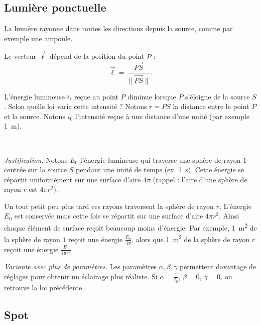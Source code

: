 \documentclass[11pt,class=report,crop=false]{standalone}
\begin{document}
\subsection{Lumière ponctuelle}
\label{ssec:lumiere-ponctuelle}

La lumière \og{}rayonne\fg{} dans toutes les directions depuis la source, comme par exemple une ampoule.



Le vecteur $\vec\ell$ dépend de la position du point $P$ :
$$\vec \ell = \frac{\overrightarrow{PS}}{\|\overrightarrow{PS}\|}.$$

L'énergie lumineuse $i_\ell$ reçue au point $P$ diminue lorsque $P$ s'éloigne de la source $S$. Selon quelle loi varie cette intensité ?
Notons $r = PS$ la distance entre le point $P$ et la source. Notons $i_0$ l'intensité reçue à une distance d'une unité (par exemple \SI{1}{\meter}).
\begin{proposition}
~
\end{proposition}

\emph{Justification.} Notons $E_0$ l'énergie lumineuse qui traverse une sphère de rayon $1$ centrée sur la source $S$ pendant une unité de temps (ex. \SI{1}{\second}). Cette énergie se répartit uniformément sur une surface d'aire $4\pi$ (rappel : l'aire d'une sphère de rayon $r$ est $4\pi r^2$). 



Un tout petit peu plus tard ces rayons traversent la sphère de rayon $r$. L'énergie $E_0$ est conservée mais cette fois se répartit sur une surface d'aire $4\pi r^2$. Ainsi chaque élément de surface reçoit beaucoup moins d'énergie.
Par exemple, \SI{1}{\meter^2} de la sphère de rayon $1$ reçoit une énergie $\frac{E_0}{4\pi}$, alors que \SI{1}{\meter^2} de la sphère de rayon $r$  reçoit une énergie $\frac{E_0}{4\pi r^2}$.

\bigskip

\emph{Variante avec plus de paramètres.} 
Les paramètres $\alpha,\beta,\gamma$ permettent davantage de réglages pour obtenir un éclairage plus réaliste. Si $\alpha = \frac{1}{i_0}$, $\beta=0$, $\gamma=0$, on retrouve la loi précédente.

\subsection{Spot}
\end{document}

